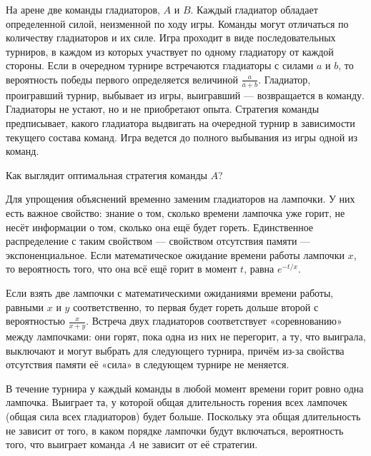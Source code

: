 \documentclass[nobib]{tufte-handout}
\theoremstyle{definition}
\newcounter{problem}
\newenvironment{problem}%
{%
\refstepcounter{problem}%
     \hypertarget{problem:{\theproblem}}{}
     \Writetofile{solution_file}{\protect\hypertarget{soln:\theproblem}{}}
     \begin{myenum}[label=\bfseries\protect\hyperlink{soln:\theproblem}{\theproblem},ref=\theproblem]
     \item%
    }%
    {%
    \end{myenum}}
\begin{document}
\begin{problem}
На арене две команды гладиаторов, $A$ и $B$. Каждый гладиатор обладает
определенной силой, неизменной по ходу игры. Команды могут отличаться
по количеству гладиаторов и их силе. Игра проходит в виде последовательных турниров,
в каждом из которых участвует по одному гладиатору от каждой стороны.
Если в очередном турнире встречаются гладиаторы с силами $a$ и $b$,
то вероятность победы первого определяется величиной  $\frac{a}{a+b}$.
Гладиатор, проигравший турнир, выбывает из игры, выигравший — возвращается в команду.
Гладиаторы не устают, но и не приобретают опыта. Стратегия команды предписывает,
какого гладиатора выдвигать на очередной турнир в зависимости текущего состава команд.
Игра ведется до полного выбывания из игры одной из команд.

Как выглядит оптимальная стратегия команды $A$?

\begin{sol}
Для упрощения объяснений временно заменим гладиаторов на лампочки.
У них есть важное свойство: знание о том, сколько времени лампочка уже горит,
не несёт информации о том, сколько она ещё будет гореть.
Единственное распределение с таким свойством — свойством отсутствия памяти — экспоненциальное. Если математическое ожидание времени работы лампочки $x$,
то вероятность того, что она всё ещё горит в момент $t$, равна $e^{-t/x}$.

Если взять две лампочки с математическими ожиданиями времени работы,
равными $x$ и $y$ соответственно,
то первая будет гореть дольше второй с вероятностью $\frac{x}{x+y}$.
Встреча двух гладиаторов соответствует «соревнованию» между лампочками:
они горят, пока одна из них не перегорит, а ту, что выиграла,
выключают и могут выбрать для следующего турнира,
причём из-за свойства отсутствия памяти её «сила» в следующем турнире не меняется.

В течение турнира у каждый команды в любой момент времени горит ровно одна лампочка.
Выиграет та, у которой общая длительность горения всех лампочек
(общая сила всех гладиаторов) будет больше.
Поскольку эта общая длительность не зависит от того,
в каком порядке лампочки будут включаться, вероятность того,
что выиграет команда $A$ не зависит от её стратегии.

\end{sol}

\end{problem}
\end{document}
